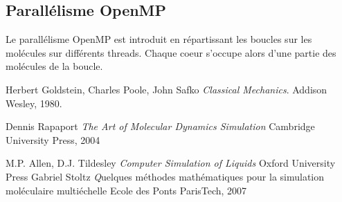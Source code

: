 \documentclass[12pt]{article}
\begin{document}
%
%

\subsection{Parallélisme OpenMP}

Le parallélisme OpenMP est introduit en répartissant les boucles sur les molécules sur différents threads. Chaque coeur s'occupe alors d'une partie des molécules de la boucle.

\clearpage
	\begin{thebibliography}{9}
	
Herbert Goldstein, Charles Poole, John Safko
	\emph{Classical Mechanics}.
Addison Wesley, 1980.
      
Dennis Rapaport
    \emph{The Art of Molecular Dynamics Simulation}
Cambridge University Press, 2004

M.P. Allen, D.J. Tildesley
    \emph{Computer Simulation of Liquids}
Oxford University Press  
Gabriel Stoltz
	\emph Quelques méthodes mathématiques pour la simulation moléculaire multiéchelle
Ecole des Ponts ParisTech, 2007
	\end{thebibliography}
\end{document}
